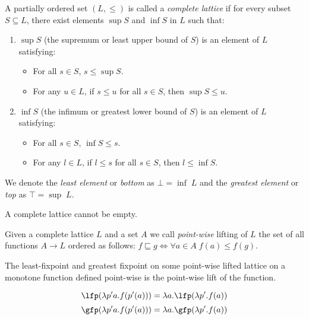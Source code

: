 \begin{definition}
  A partially ordered set \((L, \leq)\) is called a \emph{complete lattice} if
  for every subset \(S \subseteq L\), there exist elements \(\sup S\) and
  \(\inf S\) in \(L\) such that: 
  \begin{enumerate}
    \item \(\sup S\) (the supremum or least upper bound of \(S\)) is an
      element of \(L\) satisfying: 
      \begin{itemize}
        \item For all \(s \in S\), \(s \leq \sup S\).
        \item For any \(u \in L\), if \(s \leq u\) for all \(s \in S\), then
          \(\sup S \leq u\). \end{itemize}
    \item \(\inf S\) (the infimum or greatest lower bound of \(S\)) is an
      element of \(L\) satisfying: 
      \begin{itemize}
        \item For all \(s \in S\), \(\inf S \leq s\).
        \item For any \(l \in L\), if \(l \leq s\) for all \(s \in S\), then
          \(l \leq \inf S\). 
      \end{itemize}
  \end{enumerate}

  We denote the \textit{least element} or \textit{bottom} as $\bot = \inf \; L$ 
  and the \textit{greatest element} or \textit{top} as $\top = \sup \; L$.
\end{definition}

\begin{observation}
  A complete lattice cannot be empty.
\end{observation}

\begin{definition}
  Given a complete lattice $L$ and a set $A$ we call \textit{point-wise} lifting
  of $L$ the set of all functions $A \to L$ ordered as follows: $f \sqsubseteq 
  g \iff \forall a \in A \; f(a) \leq f(g)$.
\end{definition}

\begin{observation}
  \label{th:pointfix}
  The least-fixpoint and greatest fixpoint on some point-wise lifted lattice on 
  a monotone function defined point-wise is the point-wise lift of the function.

  $$\lfp(\lambda p' a . f(p'(a))) = \lambda a . \lfp(\lambda p' . f(a))$$
  $$\gfp(\lambda p' a . f(p'(a))) = \lambda a . \gfp(\lambda p' . f(a))$$
\end{observation}


